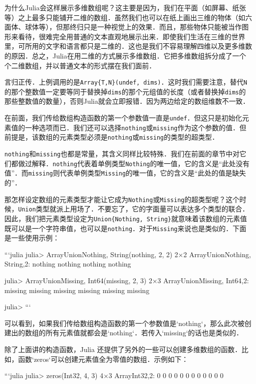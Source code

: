 为什么Julia会这样展示多维数组呢？这主要是因为，我们在平面（如屏幕、纸张等）之上最多只能铺开二维的数组．虽然我们也可以在纸上画出三维的物体（如六面体、球体等），但那终归只是一种视觉上的效果．而且，那些物体只能被当作图形来看待，很难完全用普通的文本直观地展示出来．即使我们生活在三维的世界里，可所用的文字和语言都只是二维的．这也是我们不容易理解四维以及更多维数的原因．总之，Julia在用二维的方式展示多维数组．它把多维数组拆分成了一个个二维数组，并以普通文本的形式摆在我们面前．

言归正传．上例调用的是\verb|Array{T,N}(undef, dims)|．这时我们需要注意，替代\verb|N|的那个整数值一定要等同于替换掉\verb|dims|的那个元组值的长度（或者替换掉\verb|dims|的那些整数值的数量），否则Julia就会立即报错．因为两边给定的数组维数不一致．

在前面，我们传给数组构造函数的第一个参数值一直是\verb|undef|．但这只是初始化元素值的一种选项而已．我们还可以选择\verb|nothing|或\verb|missing|作为这个参数的值．但前提是，该数组的元素类型必须是\verb|nothing|或\verb|missing|的类型的超类型．

\verb|nothing|和\verb|missing|也都是常量，其含义同样比较特殊．我们在前面的章节中对它们都做过解释．\verb|nothing|代表着单例类型\verb|Nothing|的唯一值，它的含义是“此处没有值”．而\verb|missing|则代表单例类型\verb|Missing|的唯一值，它的含义是“此处的值是缺失的”．

那怎样设定数组的元素类型才能让它成为\verb|Nothing|或\verb|Missing|的超类型呢？这个时候，\verb|Union|类型就派上用场了．不要忘了，它的字面量可以表达多个类型的联合．因此，我们把元素类型设定为\verb|Union{Nothing, String}|就意味着该数组的元素值既可以是一个字符串值，也可以是\verb|nothing|．对于\verb|Missing|来说也是类似的．下面是一些使用示例：

```julia
julia> Array{Union{Nothing, String}}(nothing, 2, 2)
2×2 Array{Union{Nothing, String},2}:
 nothing  nothing
 nothing  nothing

julia> Array{Union{Missing, Int64}}(missing, 2, 3)
2×3 Array{Union{Missing, Int64},2}:
 missing  missing  missing
 missing  missing  missing

julia> 
```

可以看到，如果我们传给数组构造函数的第一个参数值是`nothing`，那么此次被创建出的数组的所有元素值就都会是`nothing`．若传入`missing`的话也是类似的．

除了上面讲的构造函数，Julia 还提供了另外的一些可以创建多维数组的函数．比如，函数`zeros`可以创建元素值全为零值的数组．示例如下：

```julia
julia> zeros(Int32, 4, 3)
4×3 Array{Int32,2}:
 0  0  0
 0  0  0
 0  0  0
 0  0  0

